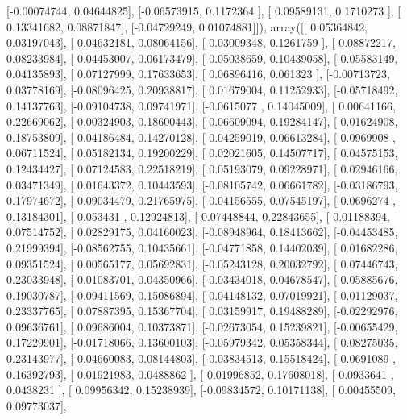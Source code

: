 \documentclass{article}
\begin{document}
       [-0.00074744,  0.04644825],
       [-0.06573915,  0.1172364 ],
       [ 0.09589131,  0.1710273 ],
       [ 0.13341682,  0.08871847],
       [-0.04729249,  0.01074881]]), array([[ 0.05364842,  0.03197043],
       [ 0.04632181,  0.08064156],
       [ 0.03009348,  0.1261759 ],
       [ 0.08872217,  0.08233984],
       [ 0.04453007,  0.06173479],
       [ 0.05038659,  0.10439058],
       [-0.05583149,  0.04135893],
       [ 0.07127999,  0.17633653],
       [ 0.06896416,  0.061323  ],
       [-0.00713723,  0.03778169],
       [-0.08096425,  0.20938817],
       [ 0.01679004,  0.11252933],
       [-0.05718492,  0.14137763],
       [-0.09104738,  0.09741971],
       [-0.0615077 ,  0.14045009],
       [ 0.00641166,  0.22669062],
       [ 0.00324903,  0.18600443],
       [ 0.06609094,  0.19284147],
       [ 0.01624908,  0.18753809],
       [ 0.04186484,  0.14270128],
       [ 0.04259019,  0.06613284],
       [ 0.0969908 ,  0.06711524],
       [ 0.05182134,  0.19200229],
       [ 0.02021605,  0.14507717],
       [ 0.04575153,  0.12434427],
       [ 0.07124583,  0.22518219],
       [ 0.05193079,  0.09228971],
       [ 0.02946166,  0.03471349],
       [ 0.01643372,  0.10443593],
       [-0.08105742,  0.06661782],
       [-0.03186793,  0.17974672],
       [-0.09034479,  0.21765975],
       [ 0.04156555,  0.07545197],
       [-0.0696274 ,  0.13184301],
       [ 0.053431  ,  0.12924813],
       [-0.07448844,  0.22843655],
       [ 0.01188394,  0.07514752],
       [ 0.02829175,  0.04160023],
       [-0.08948964,  0.18413662],
       [-0.04453485,  0.21999394],
       [-0.08562755,  0.10435661],
       [-0.04771858,  0.14402039],
       [ 0.01682286,  0.09351524],
       [ 0.00565177,  0.05692831],
       [-0.05243128,  0.20032792],
       [ 0.07446743,  0.23033948],
       [-0.01083701,  0.04350966],
       [-0.03434018,  0.04678547],
       [ 0.05885676,  0.19030787],
       [-0.09411569,  0.15086894],
       [ 0.04148132,  0.07019921],
       [-0.01129037,  0.23337765],
       [ 0.07887395,  0.15367704],
       [ 0.03159917,  0.19488289],
       [-0.02292976,  0.09636761],
       [ 0.09686004,  0.10373871],
       [-0.02673054,  0.15239821],
       [-0.00655429,  0.17229901],
       [-0.01718066,  0.13600103],
       [-0.05979342,  0.05358344],
       [ 0.08275035,  0.23143977],
       [-0.04660083,  0.08144803],
       [-0.03834513,  0.15518424],
       [-0.0691089 ,  0.16392793],
       [ 0.01921983,  0.0488862 ],
       [ 0.01996852,  0.17608018],
       [-0.0933641 ,  0.0438231 ],
       [ 0.09956342,  0.15238939],
       [-0.09834572,  0.10171138],
       [ 0.00455509,  0.09773037],
\end{document}
